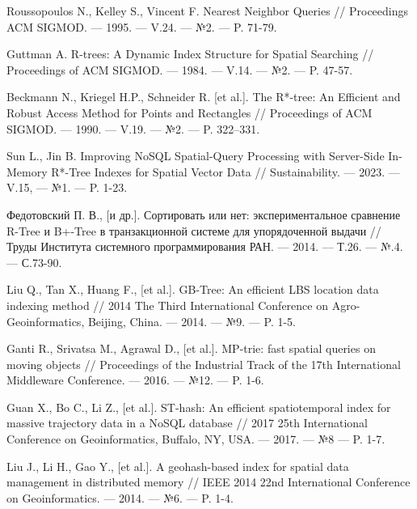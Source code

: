 %

% 


\begin{thebibliography}{9}

Roussopoulos N., Kelley S., Vincent F. Nearest Neighbor Queries // Proceedings ACM SIGMOD. --- 1995. --- V.24. --- №2. --- P. 71-79.

Guttman A. R-trees: A Dynamic Index Structure for Spatial Searching // Proceedings of ACM SIGMOD. --- 1984. --- V.14. --- №2. --- P. 47-57.

Beckmann N., Kriegel H.P., Schneider R. [et al.]. The R*-tree: An Efficient and Robust Access Method for Points and Rectangles // Proceedings of ACM SIGMOD. --- 1990. --- V.19. --- №2. --- P. 322–331.

Sun L., Jin B. Improving NoSQL Spatial-Query Processing with Server-Side In-Memory R*-Tree Indexes for Spatial Vector Data // Sustainability. --- 2023. --- V.15, --- №1. --- P. 1-23. 

Федотовский П. В., [и др.]. Сортировать или нет: экспериментальное сравнение R-Tree и B+-Tree в транзакционной системе для упорядоченной выдачи // Труды Института системного программирования РАН. --- 2014. --- Т.26. --- №.4. --- С.73-90.


Liu Q., Tan X., Huang F., [et al.]. GB-Tree: An efficient LBS location data indexing method // 2014 The Third International Conference on Agro-Geoinformatics, Beijing, China. --- 2014. --- №9. --- P. 1-5.

Ganti R., Srivatsa M., Agrawal D., [et al.]. MP-trie: fast spatial queries on moving objects // Proceedings of the Industrial Track of the 17th International Middleware Conference. --- 2016. --- №12. --- P. 1-6.

Guan X., Bo C., Li Z., [et al.]. ST-hash: An efficient spatiotemporal index for massive trajectory data in a NoSQL database //  2017 25th International Conference on Geoinformatics, Buffalo, NY, USA. --- 2017. --- №8 --- P. 1-7.

Liu J., Li H., Gao Y., [et al.]. A geohash-based index for spatial data management in distributed memory // IEEE 2014 22nd International Conference on Geoinformatics. --- 2014. --- №6. --- P. 1-4.


\end{thebibliography}

